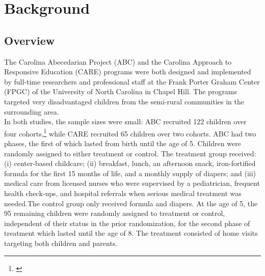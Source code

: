 \singlespacing
\pagebreak
\tableofcontents
\listoffigures
\listoftables
\pagebreak

\section{Background} \label{section:bakcground}
\subsection{Overview}

\noindent The Carolina Abecedarian Project (ABC) and the Carolina Approach to Responsive Education (CARE) programs were both designed and implemented by full-time researchers and professional staff at the Frank Porter Graham Center (FPGC) of the University of North Carolina in Chapel Hill. The programs targeted very disadvantaged children from the semi-rural communities in the surrounding area.\\

\noindent In both studies, the sample sizes were small: ABC recruited 122 children over four cohorts,\footnote{\citet{Ramey_Collier_etal_1976_CarolinaAbecedarianProject}} while CARE recruited 65 children over two cohorts. ABC had two phases, the first of which lasted from birth until the age of 5. Children were randomly assigned to either treatment or control. The treatment group received: (i) center-based childcare; (ii) breakfast, lunch, an afternoon snack, iron-fortified formula for the first 15 months of life, and a monthly supply of diapers; and (iii) medical care from licensed nurses who were supervised by a pediatrician, frequent health check-ups, and hospital referrals when serious medical treatment was needed.The control group only received formula and diapers. At the age of 5, the 95 remaining children were randomly assigned to treatment or control, independent of their status in the prior randomization, for the second phase of treatment which lasted until the age of 8. The treatment consisted of home visits targeting both children and parents.\\ 

